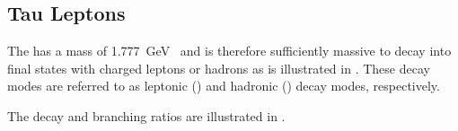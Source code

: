 

\subsection{Tau Leptons}%
\label{sec:tau_rec}

The \taulepton has a mass of \SI{1.777}{\GeV}~\cite{pdg2020} and is therefore
sufficiently massive to decay into final states with charged leptons or hadrons
as is illustrated in . These decay modes are referred to
as leptonic (\taulep) and hadronic (\tauhad) decay modes, respectively.


The \taulepton decay and branching ratios are illustrated in
.




